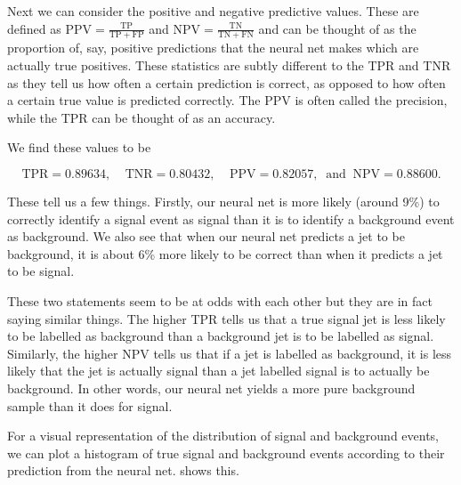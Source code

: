 \documentclass[11pt]{article}
\numberwithin{equation}{section}
\numberwithin{figure}{section}
\numberwithin{table}{section}
\begin{document}
Next we can consider the positive and negative predictive values. These are defined as $\mathrm{PPV}=\frac{\mathrm{TP}}{\mathrm{TP}+\mathrm{FP}}$ and $\mathrm{NPV}=\frac{\mathrm{TN}}{\mathrm{TN}+\mathrm{FN}}$ and can be thought of as the proportion of, say, positive predictions that the neural net makes which are actually true positives. These statistics are subtly different to the TPR and TNR as they tell us how often a certain prediction is correct, as opposed to how often a certain true value is predicted correctly. The PPV is often called the precision, while the TPR can be thought of as an accuracy. 

We find these values to be 

\begin{equation*}
    \mathrm{TPR}=0.89634,\;\;\;\; \mathrm{TNR}=0.80432,\;\;\;\; \mathrm{PPV}=0.82057,\;\;\mathrm{and}\;\; \mathrm{NPV}=0.88600.
\end{equation*}

These tell us a few things. Firstly, our neural net is more likely (around 9\%) to correctly identify a signal event as signal than it is to identify a background event as background. We also see that when our neural net predicts a jet to be background, it is about 6\% more likely to be correct than when it predicts a jet to be signal. 

These two statements seem to be at odds with each other but they are in fact saying similar things. The higher TPR tells us that a true signal jet is less likely to be labelled as background than a background jet is to be labelled as signal. Similarly, the higher NPV tells us that if a jet is labelled as background, it is less likely that the jet is actually signal than a jet labelled signal is to actually be background. In other words, our neural net yields a more pure background sample than it does for signal. 

For a visual representation of the distribution of signal and background events, we can plot a histogram of true signal and background events according to their prediction from the neural net.  shows this. 
\end{document}
